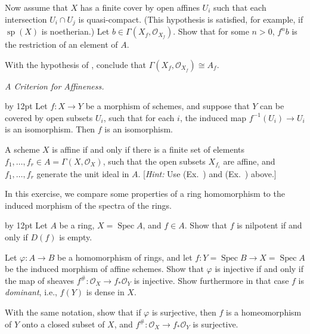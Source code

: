 {{{\noindent\hypertarget{ex-II-2.16c}{}Now assume that $X$ has a finite cover by open affines $U_i$ such that each intersection $U_i\cap U_j$ is quasi-compact. (This hypothesis is satisfied, for example, if $\operatorname{sp}(X)$ is noetherian.) Let $b\in\Gamma(X_f,\mathcal O_{X_f})$. Show that for some $n>0$, $f^nb$ is the restriction of an element of $A$.

\noindent\hypertarget{ex-II-2.16d}{}With the hypothesis of , conclude that $\Gamma(X_f,\mathcal O_{X_f})\cong A_f$.\par}

\smallskip
\noindent\hypertarget{ex-II-2.17}{}\emph{A Criterion for Affineness.}

{\advance\leftskip by 12pt
\noindent\hypertarget{ex-II-2.17a}{}Let $f\colon X\to Y$ be a morphism of schemes, and suppose that $Y$ can be covered by open subsets $U_i$, such that for each $i$, the induced map $f^{-1}(U_i)\to U_i$ is an isomorphism. Then $f$ is an isomorphism.

\noindent\hypertarget{ex-II-2.17b}{}A scheme $X$ is affine if and only if there is a finite set of elements $f_1,\ldots,f_r\in A=\Gamma(X,\mathcal O_X)$, such that the open subsets $X_{f_i}$ are affine, and $f_1,\ldots,f_r$ generate the unit ideal in $A$. [\emph{Hint:} Use (Ex.~) and (Ex.~) above.]\par}

\smallskip
\noindent\hypertarget{ex-II-2.18}{}In this exercise, we compare some properties of a ring homomorphism to the induced morphism of the spectra of the rings.

{\advance\leftskip by 12pt
\noindent\hypertarget{ex-II-2.18a}{}Let $A$ be a ring, $X=\operatorname{Spec}A$, and $f\in A$. Show that $f$ is nilpotent if and only if $D(f)$ is empty.

\noindent\hypertarget{ex-II-2.18b}{}Let $\varphi\colon A\to B$ be a homomorphism of rings, and let $f\colon Y=\operatorname{Spec}B\to X=\operatorname{Spec}A$ be the induced morphism of affine schemes. Show that $\varphi$ is injective if and only if the map of sheaves $f^\#\colon\mathcal O_X\to f_*\mathcal O_Y$ is injective. Show furthermore in that case $f$ is \emph{dominant}, i.e., $f(Y)$ is dense in $X$.

\noindent\hypertarget{ex-II-2.18c}{}With the same notation, show that if $\varphi$ is surjective, then $f$ is a homeomorphism of $Y$ onto a closed subset of $X$, and $f^\#\colon\mathcal O_X\to f_*\mathcal O_Y$ is surjective.\par}\par}
}
